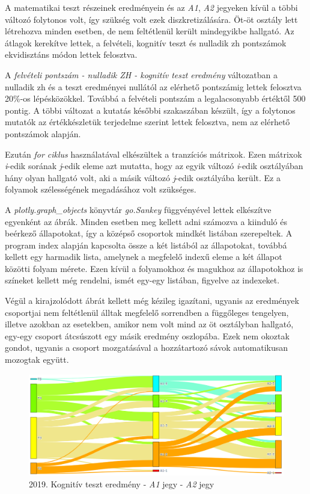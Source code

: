 \documentclass[12pt]{article}
\begin{document}
A matematikai teszt részeinek eredményein és az \textit{A1}, \textit{A2} jegyeken kívül a többi változó folytonos volt, így szükség volt ezek diszkretizálására. Öt-öt osztály lett létrehozva minden esetben, de nem feltétlenül került mindegyikbe hallgató. Az átlagok kerekítve lettek, a felvételi, kognitív teszt és nulladik zh pontszámok ekvidisztáns módon lettek felosztva.

A \textit{felvételi pontszám - nulladik ZH - kognitív teszt eredmény} változatban a nulladik zh és a teszt eredményei nullától az elérhető pontszámig lettek felosztva 20\%-os lépésközökkel. Továbbá a felvételi pontszám a legalacsonyabb értéktől 500 pontig. A többi változat a kutatás későbbi szakaszában készült, így a folytonos mutatók az értékkészletük terjedelme szerint lettek felosztva, nem az elérhető pontszámok alapján.

Ezután \textit{for ciklus} használatával elkészültek a tranzíciós mátrixok. Ezen mátrixok \textit{i}-edik sorának \textit{j}-edik eleme azt mutatta, hogy az egyik változó \textit{i}-edik osztályában hány olyan hallgató volt, aki a másik változó \textit{j}-edik osztályába került. Ez a folyamok szélességének megadásához volt szükséges.

A \textit{plotly.graph\_objects} könyvtár \textit{go.Sankey} függvényével lettek elkészítve egyenként az ábrák. Minden esetben meg kellett adni számozva a kiinduló és beérkező állapotokat, így a középső csoportok mindkét listában szerepeltek. A program index alapján kapcsolta össze a két listából az állapotokat, továbbá kellett egy harmadik lista, amelynek a megfelelő indexű eleme a két állapot közötti folyam mérete. Ezen kívül a folyamokhoz és magukhoz az állapotokhoz is színeket kellett még rendelni, ismét egy-egy listában, figyelve az indexeket. 

Végül a kirajzolódott ábrát kellett még kézileg igazítani, ugyanis az eredmények csoportjai nem feltétlenül álltak megfelelő sorrendben a függőleges tengelyen, illetve azokban az esetekben, amikor nem volt mind az öt osztályban hallgató, egy-egy csoport átcsúszott egy másik eredmény oszlopába. Ezek nem okoztak gondot, ugyanis a csoport mozgatásával a hozzátartozó sávok automatikusan mozogtak együtt.

\begin{figure}[H]
\centering
\includegraphics[scale=0.573]{kepek/teszt-a1-a2.png}
\caption{2019. Kognitív teszt eredmény - \textit{A1} jegy - \textit{A2} jegy}
\label{fig:teszt-a1-a2}
\end{figure}
\end{document}
